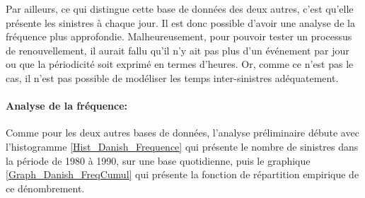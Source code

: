 		Par ailleurs, ce qui distingue cette base de données des deux autres, c'est qu'elle présente les sinistres à chaque jour. Il est donc possible d'avoir une analyse de la fréquence plus approfondie. Malheureusement, pour pouvoir tester un processus de renouvellement, il aurait fallu qu'il n'y ait pas plus d'un événement par jour ou que la périodicité soit exprimé en termes d'heures. Or, comme ce n'est pas le cas, il n'est pas possible de modéliser les temps inter-sinistres adéquatement.
		
		\paragraph{Analyse de la fréquence:}
		Comme pour les deux autres bases de données, l'analyse préliminaire débute avec l'histogramme \ref{Hist_Danish_Frequence} qui présente le nombre de sinistres dans la période de 1980 à 1990, sur une base quotidienne, puis le graphique \ref{Graph_Danish_FreqCumul} qui présente la fonction de répartition  empirique de ce dénombrement.
		
